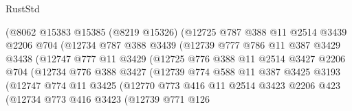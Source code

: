 \begin{lexlean}{RustStd}
\begin{coremodule}
                      (@8062
                        @15383
                        @15385
                        (@8219 @15326)
                        (@12725
                          @787
                          @388
                          @11
                          @2514
                          @3439
                          @2206
                          @704
                          (@12734
                            @787
                            @388
                            @3439
                            (@12739
                              @777
                              @786
                              @11
                              @387
                              @3429
                              @3438
                              (@12747
                                @777
                                @11
                                @3429
                                (@12725
                                  @776
                                  @388
                                  @11
                                  @2514
                                  @3427
                                  @2206
                                  @704
                                  (@12734
                                    @776
                                    @388
                                    @3427
                                    (@12739
                                      @774
                                      @588
                                      @11
                                      @387
                                      @3425
                                      @3193
                                      (@12747
                                        @774
                                        @11
                                        @3425
                                        (@12770
                                          @773
                                          @416
                                          @11
                                          @2514
                                          @3423
                                          @2206
                                          @423
                                          (@12734
                                            @773
                                            @416
                                            @3423
                                            (@12739
                                              @771
                                              @126

\end{coremodule}
\end{lexlean}
